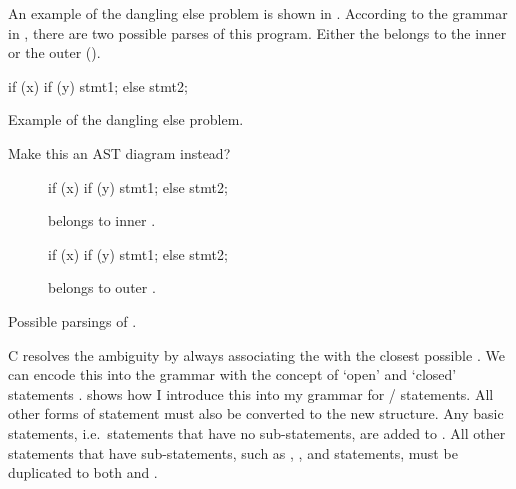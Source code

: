\documentclass[00-main.tex]{subfiles}
\begin{document}
An example of the dangling else problem is shown in .
According to the grammar in , there are two possible parses of this program.
Either the  belongs to the inner or the outer  ().

\begin{listing}[!ht]
  \begin{CListing}
    if (x)
      if (y)
        stmt1;
    else
      stmt2;
  \end{CListing}
  \caption{Example of the dangling else problem.}
  \label{lst:dangling else}
\end{listing}

\begin{listing}[!ht]
  \begin{mrwComment}
  Make this an AST diagram instead?
  \end{mrwComment}
  \begin{subfigure}[t]{0.49\textwidth}
    \begin{CListing}
      if (x) {
        if (y) {
          stmt1;
        } else {
          stmt2;
        }
      }
    \end{CListing}
    \caption{ belongs to inner .}
  \end{subfigure}
  \hfill
  \begin{subfigure}[t]{0.49\textwidth}
    \begin{CListing}
      if (x) {
        if (y) {
          stmt1;
        }
      } else {
        stmt2;
      }
    \end{CListing}
    \caption{ belongs to outer .}
  \end{subfigure}
  \caption{Possible parsings of .}
  \label{lst:dangling else possible parsings}
\end{listing}

C resolves the ambiguity by always associating the  with the closest possible .
We can encode this into the grammar with the concept of `open' and `closed' statements .
 shows how I introduce this into my grammar for / statements.
All other forms of statement must also be converted to the new structure.
Any basic statements, i.e.\ statements that have no sub-statements, are added to .
All other statements that have sub-statements, such as , , and  statements, must be duplicated to both  and .
\end{document}
